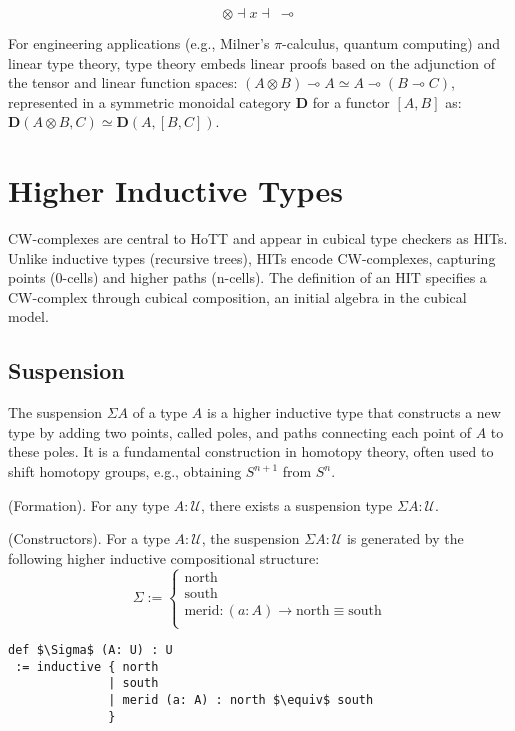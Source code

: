 \documentclass{article}
\begin{document}
$$
\otimes \dashv x \dashv\ \multimap
$$

For engineering applications (e.g., Milner's $\pi$-calculus, quantum computing)
and linear type theory, type theory embeds linear proofs based on the adjunction
of the tensor and linear function spaces: $(A \otimes B) \multimap A \simeq A \multimap (B \multimap C)$,
represented in a symmetric monoidal category $\mathbf{D}$ for a functor $[A,B]$ as:
$\mathbf{D}(A \otimes B, C) \simeq \mathbf{D}(A, [B,C])$.

\section{Higher Inductive Types}
CW-complexes are central to HoTT and appear in cubical type checkers as HITs.
Unlike inductive types (recursive trees), HITs encode CW-complexes, capturing
points (0-cells) and higher paths (n-cells). The definition of an HIT specifies a CW-complex
through cubical composition, an initial algebra in the cubical model.

\newpage
\subsection{Suspension}
The suspension \(\Sigma A\) of a type \( A \) is a higher inductive type that
constructs a new type by adding two points, called poles, and paths connecting
each point of \( A \) to these poles. It is a fundamental construction in homotopy theory,
often used to shift homotopy groups, e.g., obtaining \( S^{n+1} \) from \( S^n \).

\begin{definition} (Formation).
For any type \( A : \mathcal{U} \), there exists a suspension type \( \Sigma A : \mathcal{U} \).
\end{definition}

\begin{definition} (Constructors).
For a type \( A : \mathcal{U} \), the suspension \( \Sigma A : \mathcal{U} \)
is generated by the following higher inductive compositional structure:
\[
\Sigma :=
\begin{cases}
\text{north} \\
\text{south} \\
\text{merid} : (a : A) \rightarrow \text{north} \equiv \text{south} \\
\end{cases}
\]
\begin{lstlisting}[mathescape=true]
def $\Sigma$ (A: U) : U
 := inductive { north
              | south
              | merid (a: A) : north $\equiv$ south
              }
\end{lstlisting}
\end{definition}
\end{document}
